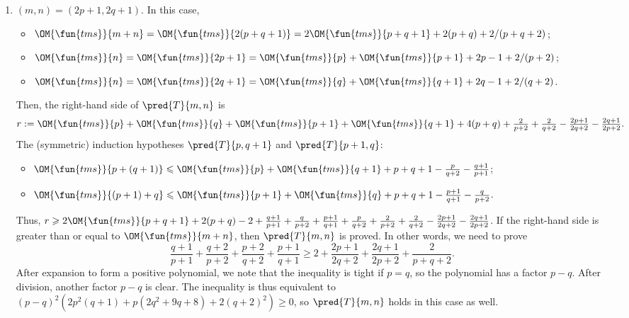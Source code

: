 \begin{enumerate}
  \item \((m,n) = (2p+1,2q+1)\). In this case,
    \begin{itemize}

      \item \(\OM{\fun{tms}}{m+n} = \OM{\fun{tms}}{2(p+q+1)} =
        2\OM{\fun{tms}}{p+q+1} + 2(p+q) + 2/(p+q+2)\);

      \item \(\OM{\fun{tms}}{n} = \OM{\fun{tms}}{2p+1} =
        \OM{\fun{tms}}{p} + \OM{\fun{tms}}{p+1} + 2p - 1 + 2/(p+2)\);

      \item \(\OM{\fun{tms}}{n} = \OM{\fun{tms}}{2q+1} =
        \OM{\fun{tms}}{q} + \OM{\fun{tms}}{q+1} + 2q - 1 + 2/(q+2)\).

    \end{itemize}
    Then, the right\hyp{}hand side of \(\pred{T}{m,n}\) is
    \begin{equation*}
      r := \OM{\fun{tms}}{p} + \OM{\fun{tms}}{q} + \OM{\fun{tms}}{p+1}
      + \OM{\fun{tms}}{q+1} + 4(p+q) + \tfrac{2}{p+2} + \tfrac{2}{q+2}
      - \tfrac{2p+1}{2q+2} - \tfrac{2q+1}{2p+2}.
    \end{equation*}
    The (symmetric) induction hypotheses \(\pred{T}{p,q+1}\) and
    \(\pred{T}{p+1,q}\):
    \begin{itemize}

      \item \(\OM{\fun{tms}}{p+(q+1)} \leqslant \OM{\fun{tms}}{p} +
        \OM{\fun{tms}}{q+1} + p + q + 1 - \tfrac{p}{q+2}
        - \tfrac{q+1}{p+1}\);

      \item \(\OM{\fun{tms}}{(p+1)+q} \leqslant \OM{\fun{tms}}{p+1} +
        \OM{\fun{tms}}{q} + p + q + 1 - \tfrac{p+1}{q+1} -
        \tfrac{q}{p+2}\).

    \end{itemize}
    Thus, \(r \geqslant 2\OM{\fun{tms}}{p+q+1} + 2(p+q) - 2 +
    \tfrac{q+1}{p+1} + \tfrac{q}{p+2} + \tfrac{p+1}{q+1} +
    \tfrac{p}{q+2} + \tfrac{2}{p+2} + \tfrac{2}{q+2} -
    \tfrac{2p+1}{2q+2} - \tfrac{2q+1}{2p+2}\). If the right\hyp{}hand
    side is greater than or equal to \(\OM{\fun{tms}}{m+n}\), then
    \(\pred{T}{m,n}\) is proved. In other words, we need to prove
    \begin{equation*}
      \frac{q+1}{p+1} + \frac{q+2}{p+2} + \frac{p+2}{q+2} +
      \frac{p+1}{q+1} \geqslant 2 + \frac{2p+1}{2q+2} +
      \frac{2q+1}{2p+2} + \frac{2}{p+q+2}.
    \end{equation*}
    After expansion to form a positive polynomial, we note that the
    inequality is tight if \(p=q\), so the polynomial has a factor
    \(p-q\). After division, another factor \(p-q\) is clear. The
    inequality is thus equivalent to \((p-q)^2(2p^2(q+1) + p(2q^2 + 9q
    + 8) + 2(q+2)^2) \geqslant 0\), so \(\pred{T}{m,n}\) holds in this
    case as well.

\end{enumerate}
